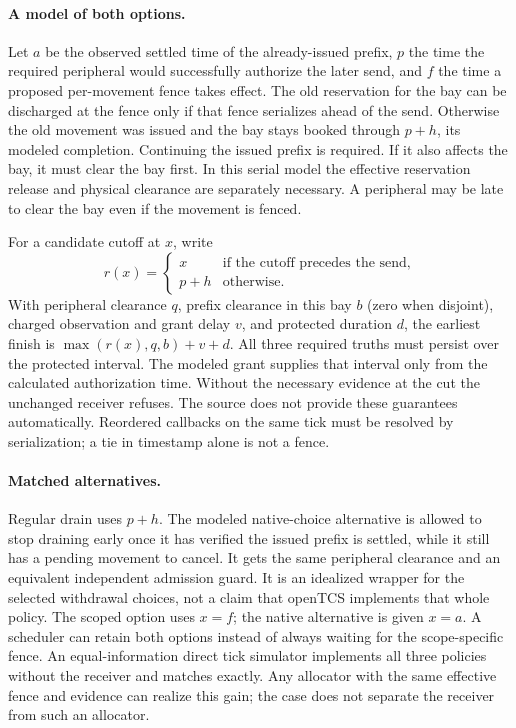\documentclass[11pt]{article}
\begin{document}
\paragraph{A model of both options.}
Let $a$ be the observed settled time of the already-issued prefix, $p$
the time the required peripheral would successfully authorize the later
send, and $f$ the time a proposed per-movement fence takes effect. The old
reservation for the bay can be discharged at the fence only if that fence
serializes ahead of the send. Otherwise the old movement was issued and
the bay stays booked through $p+h$, its modeled completion. Continuing the
issued prefix is required. If it also affects the bay, it must clear the
bay first. In this serial model the effective reservation release and
physical clearance are separately necessary. A peripheral may be late to
clear the bay even if the movement is fenced.

For a candidate cutoff at $x$, write
\[
 r(x)=\begin{cases}
      x &\text{if the cutoff precedes the send},\\
      p+h &\text{otherwise}.
      \end{cases}
\]
With peripheral clearance $q$, prefix clearance in this bay $b$ (zero
when disjoint), charged observation and grant delay $v$, and protected
duration $d$, the earliest finish is $\max(r(x),q,b)+v+d$.
All three required truths must persist over the protected
interval. The modeled grant supplies that interval only from the
calculated authorization time. Without the necessary evidence at the cut
the unchanged receiver refuses. The source does not provide these
guarantees automatically. Reordered callbacks on the same tick must be
resolved by serialization; a tie in timestamp alone is not a fence.

\paragraph{Matched alternatives.}
Regular drain uses $p+h$. The modeled native-choice alternative is
allowed to stop draining early once it has verified the issued prefix
is settled, while it still has a pending movement to cancel. It gets the
same peripheral clearance and an equivalent independent admission guard.
It is an idealized wrapper for the selected withdrawal choices, not a
claim that openTCS implements that whole policy. The scoped option uses
$x=f$; the native alternative is given $x=a$. A scheduler can retain both
options instead of always waiting for the scope-specific fence.
An equal-information direct tick simulator implements all three
policies without the receiver and matches exactly. Any allocator with
the same effective fence and evidence can realize this gain; the case
does not separate the receiver from such an allocator.
\end{document}
